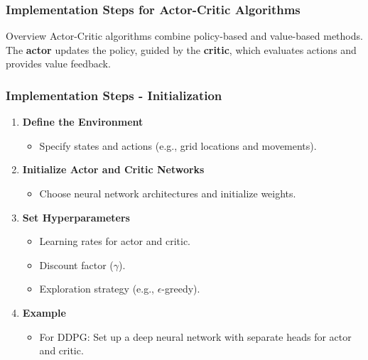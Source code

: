 \documentclass[aspectratio=169]{beamer}
\begin{document}
\begin{frame}[fragile]
    \frametitle{Implementation Steps for Actor-Critic Algorithms}
    \begin{block}{Overview}
        Actor-Critic algorithms combine policy-based and value-based methods. The \textbf{actor} updates the policy, guided by the \textbf{critic}, which evaluates actions and provides value feedback.
    \end{block}
\end{frame}

\begin{frame}[fragile]
    \frametitle{Implementation Steps - Initialization}
    \begin{enumerate}
        \item \textbf{Define the Environment}
            \begin{itemize}
                \item Specify states and actions (e.g., grid locations and movements).
            \end{itemize}
        \item \textbf{Initialize Actor and Critic Networks}
            \begin{itemize}
                \item Choose neural network architectures and initialize weights.
            \end{itemize}
        \item \textbf{Set Hyperparameters}
            \begin{itemize}
                \item Learning rates for actor and critic.
                \item Discount factor ($\gamma$).
                \item Exploration strategy (e.g., $\epsilon$-greedy).
            \end{itemize}
        \item \textbf{Example}
            \begin{itemize}
                \item For DDPG: Set up a deep neural network with separate heads for actor and critic.
            \end{itemize}
    \end{enumerate}
\end{frame}
\end{document}
